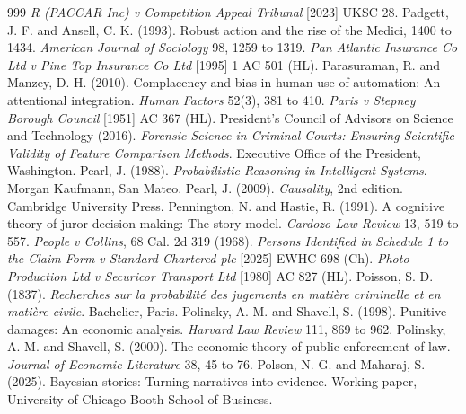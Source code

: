 \begin{thebibliography}{999}
 \emph{R (PACCAR Inc) v Competition Appeal Tribunal} [2023] UKSC 28.
 Padgett, J. F. and Ansell, C. K. (1993). Robust action and the rise of the Medici, 1400 to 1434. \emph{American Journal of Sociology} 98, 1259 to 1319.
 \emph{Pan Atlantic Insurance Co Ltd v Pine Top Insurance Co Ltd} [1995] 1 AC 501 (HL).
 Parasuraman, R. and Manzey, D. H. (2010). Complacency and bias in human use of automation: An attentional integration. \emph{Human Factors} 52(3), 381 to 410.
 \emph{Paris v Stepney Borough Council} [1951] AC 367 (HL).
 President's Council of Advisors on Science and Technology (2016). \emph{Forensic Science in Criminal Courts: Ensuring Scientific Validity of Feature Comparison Methods}. Executive Office of the President, Washington.
 Pearl, J. (1988). \emph{Probabilistic Reasoning in Intelligent Systems}. Morgan Kaufmann, San Mateo.
 Pearl, J. (2009). \emph{Causality}, 2nd edition. Cambridge University Press.
 Pennington, N. and Hastie, R. (1991). A cognitive theory of juror decision making: The story model. \emph{Cardozo Law Review} 13, 519 to 557.
 \emph{People v Collins}, 68 Cal. 2d 319 (1968).
 \emph{Persons Identified in Schedule 1 to the Claim Form v Standard Chartered plc} [2025] EWHC 698 (Ch).
 \emph{Photo Production Ltd v Securicor Transport Ltd} [1980] AC 827 (HL).
 Poisson, S. D. (1837). \emph{Recherches sur la probabilit\'e des jugements en mati\`ere criminelle et en mati\`ere civile}. Bachelier, Paris.
 Polinsky, A. M. and Shavell, S. (1998). Punitive damages: An economic analysis. \emph{Harvard Law Review} 111, 869 to 962.
 Polinsky, A. M. and Shavell, S. (2000). The economic theory of public enforcement of law. \emph{Journal of Economic Literature} 38, 45 to 76.
 Polson, N. G. and Maharaj, S. (2025). Bayesian stories: Turning narratives into evidence. Working paper, University of Chicago Booth School of Business.

\end{thebibliography}
